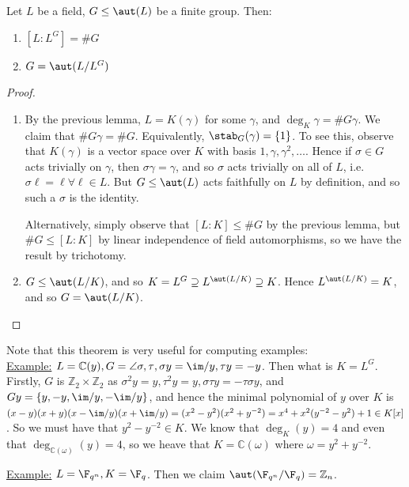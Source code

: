 \documentclass[a4paper, 10pt, twocolumn]{amsart}
\begin{document}
\begin{theorem}[Artin]
Let $L$ be a field, $G \leq \aut(L)$ be a finite group. Then:
\begin{enumerate}
\item $[L:L^G] = \#G$
\item $G = \aut(L/L^G)$
\end{enumerate}
\end{theorem}
\begin{proof}\item
\begin{enumerate}
\item By the previous lemma, $L = K(\gamma)$ for some $\gamma$, and $\deg_K \gamma = \# G\gamma$. We claim that $\#G\gamma = \#G$. Equivalently, $\stab_G(\gamma) = \{1\}$. To see this, observe that $K(\gamma)$ is a vector space over $K$ with basis $1, \gamma, \gamma^2, \ldots$. Hence if $\sigma \in G$ acts trivially on $\gamma$, then $\sigma \gamma = \gamma$, and so $\sigma$ acts trivially on all of $L$, i.e. $\sigma\ell = \ell \forall \ell \in L$. But $G \leq \aut(L)$ acts faithfully on $L$ by definition, and so such a $\sigma$ is the identity. 

Alternatively, simply observe that $[L:K]\leq \#G$ by the previous lemma, but $\#G \leq [L:K]$ by linear independence of field automorphisms, so we have the result by trichotomy.

\item $G \leq \aut(L/K)$, and so $K = L^G \supseteq L^{\aut(L/K)} \supseteq K$. Hence $L^{\aut(L/K)} = K$, and so $G = \aut(L/K)$. 
\end{enumerate}
\end{proof}

Note that this theorem is very useful for computing examples:\\
\underline{Example:} $L = \mathbb{C}(y), G = \angle{\sigma, \tau}, \sigma y = \im/y, \tau y = -y$. Then what is $K = L^G$. Firstly, $G$ is $\mathbb{Z}_2 \times \mathbb{Z}_2$ as $\sigma^2 y = y, \tau^2 y = y, \sigma \tau y = -\tau\sigma y$, and $Gy = \{y,-y, \im/y, -\im/y\}$, and hence the minimal polynomial of $y$ over $K$ is $(x-y)(x+y)(x-\im/y)(x+\im/y) = (x^2-y^2)(x^2+y^{-2}) = x^4 + x^2 (y^{-2}-y^2) + 1 \in K[x]$. So we must have that $y^2 - y^{-2} \in K$. We know that $\deg_K(y) = 4$ and even that $\deg_{\mathbb{C}(\omega)}(y) = 4$, so we heave that $K = \mathbb{C}(\omega)$ where $\omega = y^2+y^{-2}$.

\underline{Example:} $L = \F_{q^n}, K = \F_q$. Then we claim $\aut(\F_{q^n}/\F_q) = \mathbb{Z}_n$.
\end{document}
